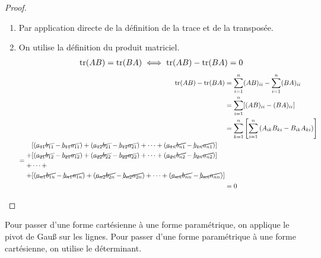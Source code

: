 \begin{proof}\leavevmode
    \begin{enumerate}
        \item Par application directe de la définition de la trace et de la transposée.
        \item On utilise la définition du produit matriciel.
        \begin{align*}
            \tr(AB) = \tr(BA) \iff \tr(AB) - \tr(BA) = 0
        \end{align*}
        \begin{align*}
            \tr(AB) - \tr(BA) &=\sum_{i=1}^n (AB)_{ii} - \sum_{i=1}^n (BA)_{ii} \\ 
            &= \sum_{i=1}^n [(AB)_{ii} - (BA)_{ii}] \\ 
            &= \sum_{k=1}^n \left[ \sum_{i=1}^n \left( A_{ik} B_{ki} - B_{ik}A_{ki} \right) \right] \\ 
            = 
            \begin{split}
                &[(\cancel{a_{11} b_{11}} - \cancel{b_{11} a_{11}}) +  (\cancel{a_{12} b_{21}} - \cancel{b_{12} a_{21}}) + \cdots + (\cancel{a_{1n} b_{n1}} - \cancel{b_{1n} a_{n1}})] \\
                + &[(\cancel{a_{21} b_{12}} - \cancel{b_{21}a_{12}}) + (\cancel{a_{22} b_{22}} - \cancel{b_{22} a_{22}}) + \cdots + (\cancel{a_{2n}b_{n2}} - \cancel{b_{2n}a_{n2}})] \\
                + &\cdots + \\ 
                + &[(\cancel{a_{n1} b_{1n}} - \cancel{b_{n1} a_{1n}}) + (\cancel{a_{n2} b_{2n}} - \cancel{b_{n2} a_{2n}}) + \cdots + (\cancel{a_{nn} b_{nn}} - \cancel{b_{nn} a_{nn}})]
            \end{split}
            \\
            &= 0
        \end{align*}
    \end{enumerate}
\end{proof}

\begin{proposition}
    Pour passer d'une forme cartésienne à une forme paramétrique, on applique le pivot de Gau{\ss} sur les lignes.
    Pour passer d'une forme paramétrique à une forme cartésienne, on utilise le déterminant.
\end{proposition}
